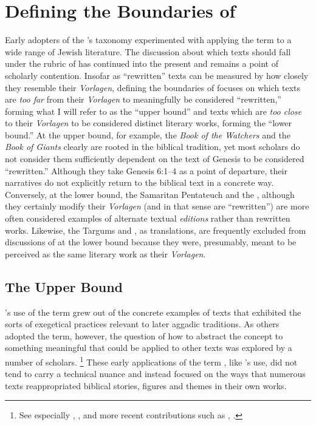 
\section{Defining the Boundaries of \RWB}

Early adopters of the \vermes's taxonomy experimented with applying the term \rwb to a wide range of \secondtemple Jewish literature. The discussion about which texts should fall under the rubric of \rwb has continued into the present and remains a point of scholarly contention. Insofar as ``rewritten'' texts can be measured by how closely they resemble their \emph{Vorlagen}, defining the boundaries of \rwb focuses on which texts are \emph{too far} from their \emph{Vorlagen} to meaningfully be considered ``rewritten,'' forming what I will refer to as the ``upper bound'' and texts which are \emph{too close} to their \emph{Vorlagen} to be considered distinct literary works, forming the ``lower bound.'' At the upper bound, for example, the \emph{Book of the Watchers} and the \emph{Book of Giants} clearly are rooted in the biblical tradition, yet most scholars do not consider them sufficiently dependent on the text of Genesis to be considered ``rewritten.'' Although they take Genesis 6:1--4 as a point of departure, their narratives do not explicitly return to the biblical text in a concrete way. Conversely, at the lower bound, the Samaritan Pentateuch and the , although they certainly modify their \emph{Vorlagen} (and in that sense are ``rewritten'') are more often considered examples of alternate textual \emph{editions} rather than rewritten works. Likewise, the Targums and \lxx, as translations, are frequently excluded from discussions of \rwb at the lower bound because they were, presumably, meant to be perceived as the same literary work as their \emph{Vorlagen}. 


\subsection{The Upper Bound}

\vermes's use of the term \rwb grew out of the concrete examples of texts that exhibited the sorts of exegetical practices relevant to later aggadic traditions. As others adopted the term, however, the question of how to abstract the concept to something meaningful that could be applied to other texts was explored by a number of scholars.%
%
\footnote{See especially \cite{nickelsburg_stone1984}, \cite{harrington_kraft-nickelsburg1986}, and more recent contributions such as \cite{crawford2008}, \cite{falk2007}.}
%
These early applications of the term \rwb, like \vermes's use, did not tend to carry a technical nuance and instead focused on the ways that numerous texts reappropriated biblical stories, figures and themes in their own works. 

